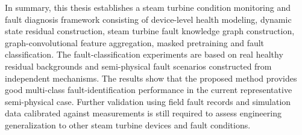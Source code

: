In summary, this thesis establishes a steam turbine condition monitoring and fault diagnosis framework consisting of device-level health modeling, dynamic state residual construction, steam turbine fault knowledge graph construction, graph-convolutional feature aggregation, masked pretraining and fault classification. The fault-classification experiments are based on real healthy residual backgrounds and semi-physical fault scenarios constructed from independent mechanisms. The results show that the proposed method provides good multi-class fault-identification performance in the current representative semi-physical case. Further validation using field fault records and simulation data calibrated against measurements is still required to assess engineering generalization to other steam turbine devices and fault conditions.

